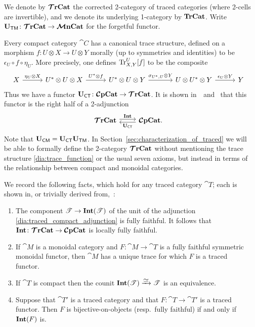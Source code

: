\documentclass[11pt,oneside,article]{memoir}
\begin{document}
We denote by $\bm{\mathcal{T}}\mathbf{rCat}$ the corrected 2-category of traced categories (where 2-cells are invertible),
and we denote its underlying 1-category by $\mathbf{TrCat}$. Write $\mathbf{U}_{\mathsf{TM}}\colon\bm{\mathcal{T}}\mathbf{rCat}\to\bm{\mathcal{M}}\mathbf{nCat}$ for the
forgetful functor.

Every compact category $\cat{C}$ has a canonical trace structure, defined on a morphism $f\colon
U\otimes X\to U\otimes Y$ morally (up to symmetries and identities) to be $\epsilon_U\circ f\circ
\eta_U$. More precisely, one defines $\operatorname{Tr}^U_{X,Y}[f]$ to be the composite
\begin{equation*}
  \begin{tikzcd}[column sep=29pt]
    X\ar[r,"\eta_U\otimes X"]&
    U^*\otimes U\otimes X\ar[r,"U^*\otimes f"]&
    U^*\otimes U\otimes Y\ar[r,"\sigma_{U^*,U}\otimes Y"]&[6pt]
    U\otimes U^*\otimes Y\ar[r,"\epsilon_U\otimes Y"]&
    Y
  \end{tikzcd}
\end{equation*}
Thus we have a functor $\mathbf{U}_{\mathsf{CT}}\colon\bm{\mathcal{C}}\mathbf{pCat}\to\bm{\mathcal{T}}\mathbf{rCat}$. It is shown
in~\cite{JoyalStreetVerity}~and~\cite{HK} that this functor is the right half of a 2-adjunction
\begin{equation}
    \label{dia:traced_compact_adjunction}
  \begin{tikzcd}
    \TTrCat\arrow[r,shift left=.5ex, "\Int"]&\CCompCat\arrow[l,shift left=.5ex,"\UCT"].
  \end{tikzcd}
\end{equation}
Note that $\mathbf{U}_{\mathsf{CM}}=\mathbf{U}_{\mathsf{CT}}\mathbf{U}_{\mathsf{TM}}$. In Section~\ref{sec:characterization_of_traced} we will be able to
formally define the 2-category $\bm{\mathcal{T}}\mathbf{rCat}$ without mentioning the trace structure
\eqref{dia:trace_function} or the usual seven axioms, but instead in terms of the relationship between
compact and monoidal categories.

\begin{remark}
    \label{rmk:fully_faithful_and_trace}
  We record the following facts, which hold for any traced category $\cat{T}$; each is shown in, or
  trivially derived from,~\cite{JoyalStreetVerity}:
  \begin{enumerate}[label={\upshape\roman*}.]
    \item The component $\mathscr{T}\to\mathbf{Int}(\mathscr{T})$ of the unit of the adjunction
      \eqref{dia:traced_compact_adjunction} is fully faithful. It follows that
      $\mathbf{Int}\colon\bm{\mathcal{T}}\mathbf{rCat}\to\bm{\mathcal{C}}\mathbf{pCat}$ is locally fully faithful.
    \item If $\cat{M}$ is a monoidal category and $F\colon\cat{M}\to\cat{T}$ is a fully faithful
      symmetric monoidal functor, then $\cat{M}$ has a unique trace for which $F$ is a traced
      functor.
    \item If $\cat{T}$ is compact then the counit
      $\Int(\cat{T})\To{\raisebox{-1ex}{$\equiv$}}\cat{T}$ is an equivalence.
    \item Suppose that $\cat{T'}$ is a traced category and that $F\colon \cat{T}\to \cat{T}'$ is a
      traced functor. Then $F$ is bijective-on-objects (resp.\ fully faithful) if and only if
      $\mathbf{Int}(F)$ is.
  \end{enumerate}
\end{remark}
\end{document}
